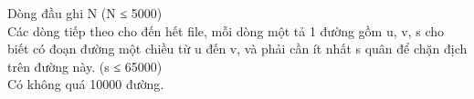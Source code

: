 Dòng đầu ghi N (N ≤ 5000)   
\\   Các dòng tiếp theo cho đến hết file, mỗi dòng một tả 1 đường gồm u, v, s cho biết có đoạn đường một chiều từ u đến v, và phải cần ít nhất s quân để chặn địch trên đường này. (s ≤ 65000)   
\\   Có không quá 10000 đường.